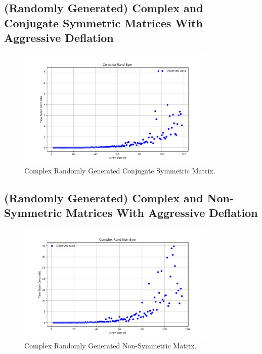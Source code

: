 \documentclass[12pt]{article}
\begin{document}
 	\subsection{(Randomly Generated) Complex and Conjugate Symmetric Matrices With Aggressive Deflation}
 	\begin{figure}[h]
 		\centering
 		\includegraphics[width=0.85\textwidth]{figs/crs.png}
 		\caption{Complex Randomly Generated Conjugate Symmetric Matrix.}
 	\end{figure}
 	\subsection{(Randomly Generated) Complex and Non-Symmetric Matrices With Aggressive Deflation}
 	\begin{figure}[h]
 		\centering
 		\includegraphics[width=0.85\textwidth]{figs/crns.png}
 		\caption{Complex Randomly Generated Non-Symmetric Matrix.}
 	\end{figure}
\end{document}
